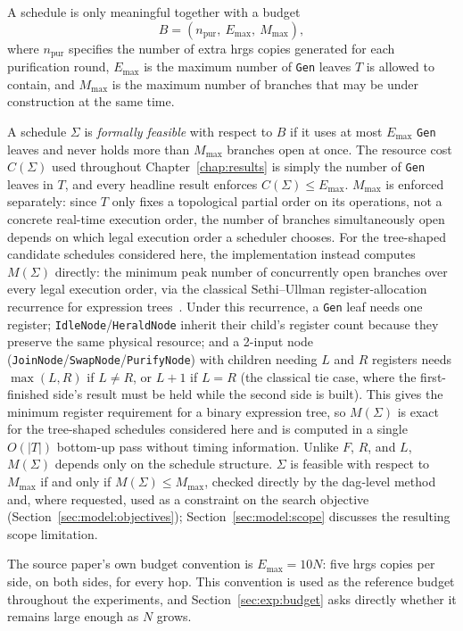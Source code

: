 A schedule is only meaningful together with a budget
\[
    B = (n_{\mathrm{pur}},\ E_{\max},\ M_{\max}),
\]
where $n_{\mathrm{pur}}$ specifies the number of extra \Gls{hrgs} copies generated for each purification round, $E_{\max}$ is the maximum number of \texttt{Gen} leaves $T$ is allowed to contain, and $M_{\max}$ is the maximum number of branches that may be under construction at the same time.

A schedule $\Sigma$ is \emph{formally feasible} with respect to $B$ if it uses at most $E_{\max}$ \texttt{Gen} leaves and never holds more than $M_{\max}$ branches open at once. The resource cost $C(\Sigma)$ used throughout Chapter~\ref{chap:results} is simply the number of \texttt{Gen} leaves in $T$, and every headline result enforces $C(\Sigma) \le E_{\max}$. $M_{\max}$ is enforced separately: since $T$ only fixes a topological partial order on its operations, not a concrete real-time execution order, the number of branches simultaneously open depends on which legal execution order a scheduler chooses. For the tree-shaped candidate schedules considered here, the implementation instead computes $M(\Sigma)$ directly: the minimum peak number of concurrently open branches over every legal execution order, via the classical Sethi--Ullman register-allocation recurrence for expression trees~\cite{Sethi1970Generation}. Under this recurrence, a \texttt{Gen} leaf needs one register; \texttt{IdleNode}/\texttt{HeraldNode} inherit their child's register count because they preserve the same physical resource; and a 2-input node (\texttt{JoinNode}/\texttt{SwapNode}/\texttt{PurifyNode}) with children needing $L$ and $R$ registers needs $\max(L,R)$ if $L\neq R$, or $L+1$ if $L=R$ (the classical tie case, where the first-finished side's result must be held while the second side is built). This gives the minimum register requirement for a binary expression tree, so $M(\Sigma)$ is exact for the tree-shaped schedules considered here and is computed in a single $O(|T|)$ bottom-up pass without timing information. Unlike $F$, $R$, and $L$, $M(\Sigma)$ depends only on the schedule structure. $\Sigma$ is feasible with respect to $M_{\max}$ if and only if $M(\Sigma) \le M_{\max}$, checked directly by the \Gls{dag}-level method and, where requested, used as a constraint on the search objective (Section~\ref{sec:model:objectives}); Section~\ref{sec:model:scope} discusses the resulting scope limitation.

The source paper's own budget convention is $E_{\max} = 10N$: five \Gls{hrgs} copies per side, on both sides, for every hop. This convention is used as the reference budget throughout the experiments, and Section~\ref{sec:exp:budget} asks directly whether it remains large enough as $N$ grows.


